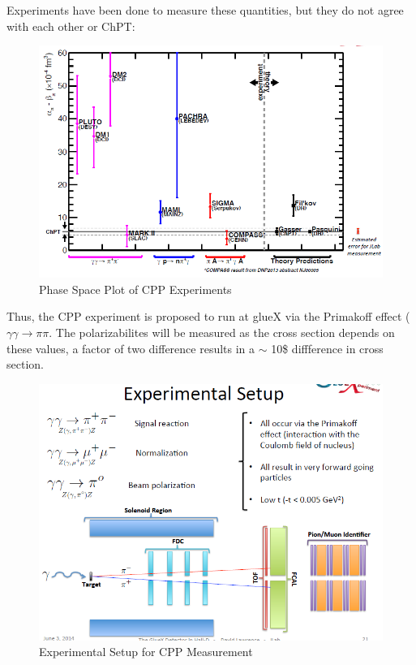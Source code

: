         Experiments have been done to measure these quantities, but they do not agree with each other or ChPT:
            
        \begin{figure}[H]
            \centering
            \includegraphics[width=12cm]{CLAS-12/modules/jlab/Other_Halls/HallD/cpp/cpp_motivation_plot.PNG}
            \caption{Phase Space Plot of CPP Experiments}
        \end{figure}
        
        Thus, the CPP experiment is proposed to run at glueX via the Primakoff effect ($\gamma \gamma \longrightarrow \pi \pi$. The polarizabilites will be measured as the cross section depends on these values, a factor of two difference results in a $\sim$ 10\$ diffference in cross section.
            
            \begin{figure}[H]
                \centering
                \includegraphics[width=12cm]{CLAS-12/modules/jlab/Other_Halls/HallD/cpp/cpp_experiment_setup.PNG}
                \caption{Experimental Setup for CPP Measurement}
            \end{figure}
            
